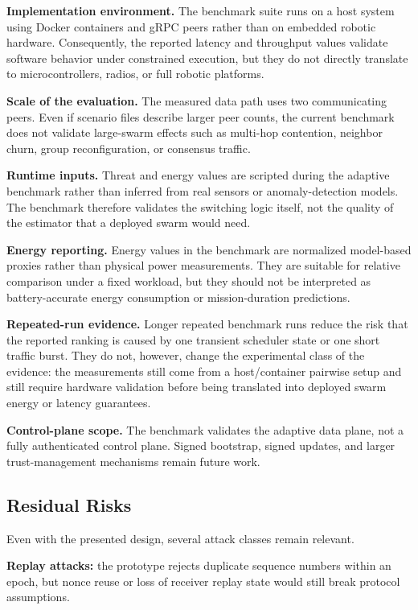 \textbf{Implementation environment.}  
The benchmark suite runs on a host system using Docker containers and gRPC peers rather than on embedded robotic hardware. Consequently, the reported latency and throughput values validate software behavior under constrained execution, but they do not directly translate to microcontrollers, radios, or full robotic platforms.

\textbf{Scale of the evaluation.}  
The measured data path uses two communicating peers. Even if scenario files describe larger peer counts, the current benchmark does not validate large-swarm effects such as multi-hop contention, neighbor churn, group reconfiguration, or consensus traffic.

\textbf{Runtime inputs.}  
Threat and energy values are scripted during the adaptive benchmark rather than inferred from real sensors or anomaly-detection models. The benchmark therefore validates the switching logic itself, not the quality of the estimator that a deployed swarm would need.

\textbf{Energy reporting.}  
Energy values in the benchmark are normalized model-based proxies rather than physical power measurements. They are suitable for relative comparison under a fixed workload, but they should not be interpreted as battery-accurate energy consumption or mission-duration predictions.

\textbf{Repeated-run evidence.}
Longer repeated benchmark runs reduce the risk that the reported ranking is caused by one transient scheduler state or one short traffic burst. They do not, however, change the experimental class of the evidence: the measurements still come from a host/container pairwise setup and still require hardware validation before being translated into deployed swarm energy or latency guarantees.

\textbf{Control-plane scope.}  
The benchmark validates the adaptive data plane, not a fully authenticated control plane. Signed bootstrap, signed updates, and larger trust-management mechanisms remain future work.

\subsection*{Residual Risks}

Even with the presented design, several attack classes remain relevant.

\textbf{Replay attacks:} the prototype rejects duplicate sequence numbers within an epoch, but nonce reuse or loss of receiver replay state would still break protocol assumptions.

